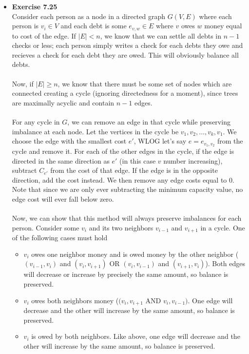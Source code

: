 \documentclass[a4paper]{article}
\begin{document}
\begin{itemize}
\item{\textbf{Exercise 7.25}} \\
Consider each person as a node in a directed graph $G(V,E)$ where each person is $v_i\in V$ and each debt is some $e_{v,w} \in E$ where $v$ owes $w$ money equal to cost of the edge. If $|E| < n$, we know that we can settle all debts in $n-1$ checks or less; each person simply writes a check for each debts they owe and recieves a check for each debt they are owed. This will obviously balance all debts. \\
\\
Now, if $|E| \geq n$, we know that there must be some set of nodes which are connected creating a cycle (ignoring directedness for a moment), since trees are maximally acyclic and contain $n-1$ edges. \\
\\
For any cycle in $G$, we can remove an edge in that cycle while preserving imbalance at each node. Let the vertices in the cycle be $v_1, v_2,\dots, v_k, v_1$. We choose the edge with the smallest cost $e'$, WLOG let's say $e = e_{v_1,v_2}$ from the cycle and remove it. For each of the other edges in the cycle, if the edge is directed in the same direction as $e'$ (in this case $v$ number increasing), subtract $C_{e'}$ from the cost of that edge. If the edge is in the opposite direction, add the cost instead. We then remove any edge costs equal to 0. Note that since we are only ever subtracting the minimum capacity value, no edge cost will ever fall below zero.\\
\\
Now, we can show that this method will always preserve imbalances for each person. Consider some $v_i$ and its two neighbors $v_{i-1}$ and $v_{i+1}$ in a cycle. One of the following cases must hold
\begin{itemize}
\item $v_i$ owes one neighbor money and is owed money by the other neighbor ($(v_{i-1}, v_{i})$ and $(v_{i}, v_{i+1})$ OR $(v_{i}, v_{i-1})$ and $(v_{i+1}, v_{i})$). Both edges will decrease or increase by precisely the same amount, so balance is preserved.
\item $v_i$ owes both neighbors money ($(v_{i}, v_{i+1}$ AND $v_{i}, v_{i-1})$. One edge will decrease and the other will increase by the same amount, so balance is preserved.
\item $v_i$ is owed by both neighbors. Like above, one  edge will decrease and the other will increase by the same amount, so balance is preserved.

\end{itemize}
\end{itemize}
\end{document}
